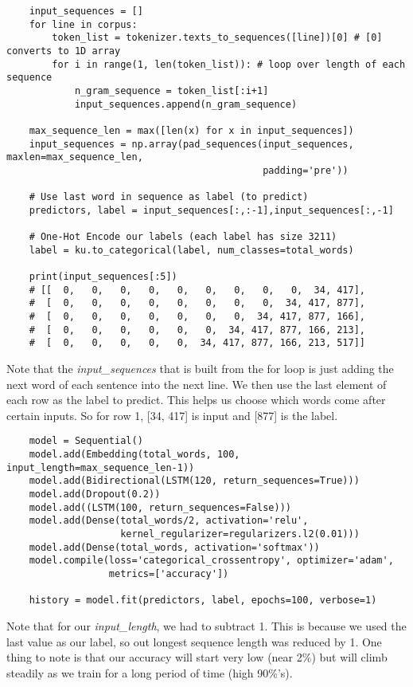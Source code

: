 \documentclass[11pt, a4paper]{article}
\begin{document}
\begin{spacing}{1.1}
\begin{lstlisting}
	input_sequences = []
	for line in corpus:
		token_list = tokenizer.texts_to_sequences([line])[0] # [0] converts to 1D array
		for i in range(1, len(token_list)): # loop over length of each sequence
			n_gram_sequence = token_list[:i+1]
			input_sequences.append(n_gram_sequence)
	
	max_sequence_len = max([len(x) for x in input_sequences])
	input_sequences = np.array(pad_sequences(input_sequences, maxlen=max_sequence_len, 
	                                         padding='pre'))
	
	# Use last word in sequence as label (to predict)
	predictors, label = input_sequences[:,:-1],input_sequences[:,-1]
	
	# One-Hot Encode our labels (each label has size 3211)
	label = ku.to_categorical(label, num_classes=total_words)
	
	print(input_sequences[:5])
	# [[  0,   0,   0,   0,   0,   0,   0,   0,   0,  34, 417],
	#  [  0,   0,   0,   0,   0,   0,   0,   0,  34, 417, 877],
	#  [  0,   0,   0,   0,   0,   0,   0,  34, 417, 877, 166],
	#  [  0,   0,   0,   0,   0,   0,  34, 417, 877, 166, 213],
	#  [  0,   0,   0,   0,   0,  34, 417, 877, 166, 213, 517]]	\end{lstlisting} \vspace*{1mm}
	Note that the \textit{input\_sequences} that is built from the for loop is just adding the next word of each sentence into the next line. We then use the last element of each row as the label to predict. This helps us choose which words come after certain inputs. So for row 1, [34, 417] is input and [877] is the label.            
	\begin{lstlisting}
	model = Sequential()
	model.add(Embedding(total_words, 100, input_length=max_sequence_len-1))
	model.add(Bidirectional(LSTM(120, return_sequences=True)))
	model.add(Dropout(0.2))
	model.add((LSTM(100, return_sequences=False)))
	model.add(Dense(total_words/2, activation='relu', 
	                kernel_regularizer=regularizers.l2(0.01)))
	model.add(Dense(total_words, activation='softmax'))
	model.compile(loss='categorical_crossentropy', optimizer='adam', 
	              metrics=['accuracy'])
	              
	history = model.fit(predictors, label, epochs=100, verbose=1) 	\end{lstlisting} \vspace*{1mm}
	Note that for our \textit{input\_length}, we had to subtract 1. This is because we used the last value as our label, so out longest sequence length was reduced by 1. One thing to note is that our accuracy will start very low (near 2\%) but will climb steadily as we train for a long period of time (high 90\%'s). \newpage


\end{spacing}
\end{document}
